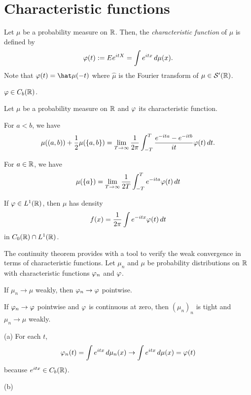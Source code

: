 \documentclass{../note}
\begin{document}
\section{Characteristic functions}

\begin{prb}
Let $\mu$ be a probability measure on $\mathbb{R}$.
Then, the \emph{characteristic function} of $\mu$ is defined by
\[\varphi(t):=Ee^{itX}=\int e^{itx}\,d\mu(x).\]
Note that $\f(t)=\hat\mu(-t)$ where $\hat\mu$ is the Fourier transform of $\mu\in\mathcal{S}'(\mathbb{R})$.
\begin{parts}
\item $\varphi\in C_b(\mathbb{R})$.
\end{parts}
\end{prb}

\begin{prb}
Let $\mu$ be a probability measure on $\mathbb{R}$ and $\varphi$ its characteristic function.
\begin{parts}
\item For $a<b$, we have
\[\mu((a,b))+\frac12\mu(\{a,b\})=\lim_{T\to\infty}\frac1{2\pi}\int_{-T}^T\frac{e^{-ita}-e^{-itb}}{it}\varphi(t)\,dt.\]
\item For $a\in\mathbb{R}$, we have
\[\mu(\{a\})=\lim_{T\to\infty}\frac1{2T}\int_{-T}^Te^{-ita}\varphi(t)\,dt\]
\item If $\varphi\in L^1(\mathbb{R})$, then $\mu$ has density
\[f(x)=\frac1{2\pi}\int e^{-itx}\varphi(t)\,dt\]
in $C_0(\mathbb{R})\cap L^1(\mathbb{R})$.
\end{parts}
\end{prb}

\begin{prb}
The continuity theorem provides with a tool to verify the weak convergence in terms of characteristic functions.
Let $\mu_n$ and $\mu$ be probability distributions on $\mathbb{R}$ with characteristic functions $\varphi_n$ and $\varphi$.
\begin{parts}
\item If $\mu_n\to\mu$ weakly, then $\varphi_n\to\varphi$ pointwise.
\item If $\varphi_n\to\varphi$ pointwise and $\varphi$ is continuous at zero, then $(\mu_n)_n$ is tight and $\mu_n\to\mu$ weakly.
\end{parts}
\end{prb}
\begin{pf}
(a)
For each $t$,
\[\varphi_n(t)=\int e^{itx}\,d\mu_n(x)\to\int e^{itx}\,d\mu(x)=\varphi(t)\]
because $e^{itx}\in C_b(\mathbb{R})$.

(b)


\end{pf}
\end{document}
